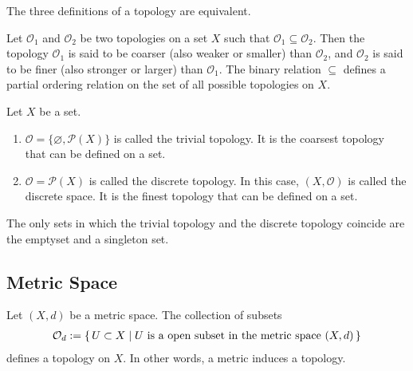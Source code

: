 %
\begin{thmbox}
    \begin{proposition}
        The three definitions of a topology are equivalent.
    \end{proposition}
\end{thmbox}
%
\begin{defbox}
    \begin{definition}
        Let \(\mathcal{O}_1\) and \(\mathcal{O}_2\) be two topologies on a set \(X\) such that \(\mathcal{O}_1 \subseteq \mathcal{O}_2\). Then the topology \(\mathcal{O}_1\) is said to be coarser (also weaker or smaller) than \(\mathcal{O}_2\), and \(\mathcal{O}_2\) is said to be finer (also stronger or larger) than \(\mathcal{O}_1\). The binary relation \(\subseteq\) defines a partial ordering relation on the set of all possible topologies on \(X\).
    \end{definition}
\end{defbox}
%
\begin{exmbox}
    \begin{example}
        Let \(X\) be a {\color{mathif}set}.
        \begin{enumerate}
            \item \(\mathcal{O} = \{\varnothing, \mathcal{P}(X)\}\) is called the {\color{maththen}trivial topology}. It is the coarsest topology that can be defined on a set.
            \item \(\mathcal{O} = \mathcal{P}(X)\) is called the {\color{maththen}discrete topology}. In this case, \((X, \mathcal{O})\) is called the {\color{maththen}discrete space}. It is the {\color{mathrem}finest topology} that can be defined on a set.
        \end{enumerate}
    \end{example}
\end{exmbox}

\begin{rembox}
    \begin{remark}
        The only sets in which the trivial topology and the discrete topology coincide are the emptyset and a singleton set.
    \end{remark}
\end{rembox}

\newpage
\subsection*{Metric Space}

\begin{thmbox}
    \begin{proposition}
        Let \((X, d)\) be a metric space. The collection of subsets
        \begin{align*}
            \mathcal{O}_d := \left\{\, U \subset X \mid U \text{ is a open subset in the metric space } (X, d) \,\right\}
        \end{align*}
        defines a topology on \(X\). In other words, a metric induces a topology.
    \end{proposition}
\end{thmbox}

